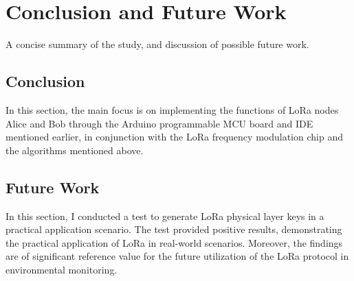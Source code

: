 
\chapter{Conclusion and Future Work}
A concise summary of the study, and discussion of possible future work.

\section{Conclusion}
In this section, the main focus is on implementing the functions of LoRa nodes Alice and Bob through the Arduino programmable MCU board and IDE mentioned earlier, in conjunction with the LoRa frequency modulation chip and the algorithms mentioned above.

\section{Future Work}
In this section, I conducted a test to generate LoRa physical layer keys in a practical application scenario. The test provided positive results, demonstrating the practical application of LoRa in real-world scenarios. Moreover, the findings are of significant reference value for the future utilization of the LoRa protocol in environmental monitoring.
